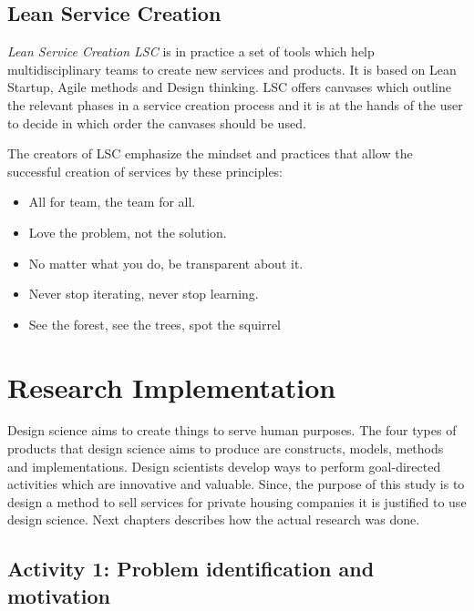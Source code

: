 \subsection{Lean Service Creation}

\emph{Lean Service Creation LSC} is in practice a set of tools which help multidisciplinary teams to create new services and products. It is based on Lean Startup, Agile methods and Design thinking. LSC offers canvases which outline the relevant phases in a service creation process and it is at the hands of the user to decide in which order the canvases should be used.

The creators of LSC emphasize the mindset and practices that allow the successful creation of services by these principles:
\begin{itemize}
	\setlength{\itemsep}{2pt}
	\item All for team, the team for all.
	\item Love the problem, not the solution.
	\item No matter what you do, be transparent about it.
	\item Never stop iterating, never stop learning.
	\item See the forest, see the trees, spot the squirrel
\end{itemize} \parencite{LSC}

\section{Research Implementation}
\label{section:research-implementation}

Design science aims to create things to serve human purposes. The four types of products that design science aims to produce are constructs, models, methods and implementations. Design scientists develop ways to perform goal-directed activities which are innovative and valuable. \parencite{Salvatore:1995} Since, the purpose of this study is to design a method to sell services for private housing companies it is justified to use design science. Next chapters describes how the actual research was done.

\subsection{Activity 1: Problem identification and motivation}

